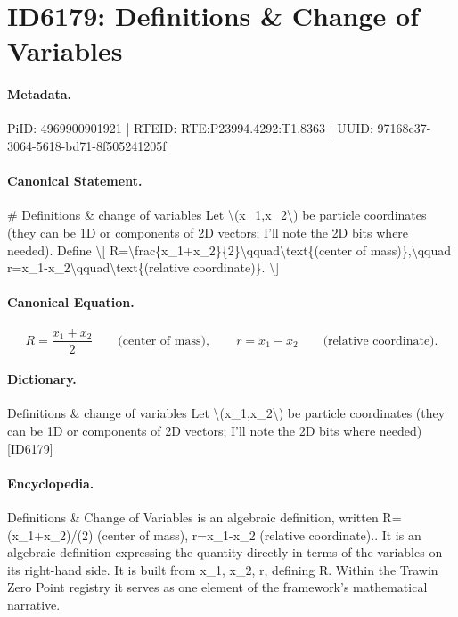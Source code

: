 \section*{ID6179: Definitions \& Change of Variables}
\paragraph{Metadata.}
PiID: 4969900901921 | RTEID: RTE:P23994.4292:T1.8363 | UUID: 97168c37-3064-5618-bd71-8f505241205f

\paragraph{Canonical Statement.}
\# Definitions \& change of variables Let \textbackslash{}(x\_1,x\_2\textbackslash{}) be particle coordinates (they can be 1D or components of 2D vectors; I’ll note the 2D bits where needed). Define \textbackslash{}[ R=\textbackslash{}frac\{x\_1+x\_2\}\{2\}\textbackslash{}qquad\textbackslash{}text\{(center of mass)\},\textbackslash{}qquad r=x\_1-x\_2\textbackslash{}qquad\textbackslash{}text\{(relative coordinate)\}. \textbackslash{}]

\paragraph{Canonical Equation.}
\[
R=\frac{x_1+x_2}{2}\qquad\text{(center of mass)},\qquad r=x_1-x_2\qquad\text{(relative coordinate)}.
\]

\paragraph{Dictionary.}
Definitions \& change of variables Let \textbackslash{}(x\_1,x\_2\textbackslash{}) be particle coordinates (they can be 1D or components of 2D vectors; I’ll note the 2D bits where needed) [ID6179]

\paragraph{Encyclopedia.}
Definitions \& Change of Variables is an algebraic definition, written R=(x\_1+x\_2)/(2) (center of mass), r=x\_1-x\_2 (relative coordinate).. It is an algebraic definition expressing the quantity directly in terms of the variables on its right-hand side. It is built from x\_1, x\_2, r, defining R. Within the Trawin Zero Point registry it serves as one element of the framework's mathematical narrative.
